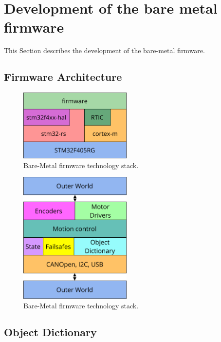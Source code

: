 \section{Development of the bare metal firmware}
\label{sec:firmware}
This Section describes the development of the bare-metal firmware.

\subsection{Firmware Architecture}
\label{subsec:firmware-arch}

\begin{figure}[H]
    \centering
    \includegraphics[width=0.5\textwidth]{obrazky/tech_stack}
    \caption{Bare-Metal firmware technology stack.}
    \label{fig:firmware_tech_stack}
\end{figure}

\begin{figure}[H]
    \centering
    \includegraphics[width=0.5\textwidth]{obrazky/firmware_arch}
    \caption{Bare-Metal firmware technology stack.}
    \label{fig:firmware_arch}
\end{figure}

\subsection{Object Dictionary}
\label{subsec:object_dict_impl}

